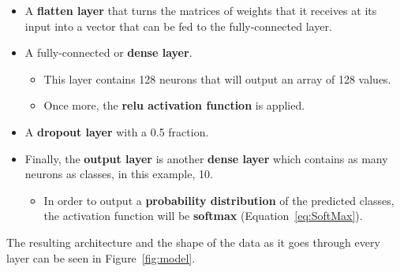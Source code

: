 \begin{itemize}
	\item A \textbf{flatten layer} that turns the matrices of weights that it receives at its input into a vector that can be fed to the fully-connected layer.
	\item A fully-connected or \textbf{dense layer}.
	\begin{itemize}
		\item This layer contains 128 neurons that will output an array of 128 values.
		\item Once more, the \textbf{\gls{relu} activation function} is applied.
	\end{itemize} 
	
	\item A \textbf{dropout layer} with a 0.5 fraction.
	
	\item Finally, the \textbf{output layer} is another \textbf{dense layer} which contains as many neurons as classes, in this example, 10. 
	\begin{itemize}
		\item In order to output a \textbf{probability distribution} of the predicted classes, the activation function will be \textbf{softmax} (Equation~\ref{eq:SoftMax}).
	\end{itemize}
\end{itemize}

The resulting architecture and the shape of the data as it goes through every layer can be seen in Figure~\ref{fig:model}.

